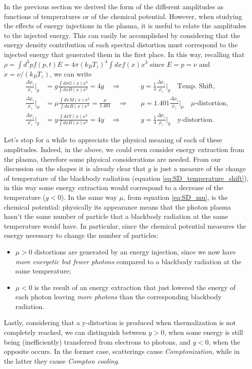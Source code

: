 In the previous section we derived the form of the different amplitudes as functions of temperatures or of the chemical potential. However, when studying the effects of energy injections in the plasma, it is useful to relate the amplitudes to the injected energy. This can easily be accomplished by considering that the energy density contribution of each spectral distortion must correspond to the injected energy that generated them in the first place. In this way, recalling that $\rho=\int d^3pf(p,t)E=4\pi (k_BT_z)^4\int dxf(x)x^3$ since $E=p=\nu$ and $x=\nu/(k_BT_z)$, we can write
\begin{align}
    \label{eq:SD_g_amplitude}\frac{\Delta \rho_\gamma}{\rho_\gamma}\bigg|_g&=g\frac{\int dxG(x)x^3}{\int dx B(x)x^3}=4g\quad\Rightarrow\quad &\boxed{g=\frac{1}{4}\frac{\Delta \rho_\gamma}{\rho_\gamma}\bigg|_g}\quad \text{Temp. Shift,}\\\label{eq:SD_mu_amplitude}
    \frac{\Delta \rho_\gamma}{\rho_\gamma}\bigg|_\mu&=\mu\frac{\int dxM(x)x^3}{\int dx B(x)x^3}=\frac{\mu}{1.401}\quad\Rightarrow\quad &\boxed{\mu=1.401\frac{\Delta \rho_\gamma}{\rho_\gamma}\bigg|_\mu}\quad\mu\text{-distortion,}\\\label{eq:SD_y_amplitude}
    \frac{\Delta \rho_\gamma}{\rho_\gamma}\bigg|_y&=y\frac{\int dxY(x)x^3}{\int dx B(x)x^3}=4y\quad\Rightarrow\quad &\boxed{y=\frac{1}{4}\frac{\Delta \rho_\gamma}{\rho_\gamma}\bigg|_y}\quad\text{y-distortion.}
\end{align}


Let's stop for a while to appreciate the physical meaning of each of these amplitudes. Indeed, in the above, we could even consider energy extraction from the plasma, therefore some physical considerations are needed. From our discussion on the shapes it is already clear that $g$ is just a measure of the change of temperature of the blackbody radiation (equation \eqref{eq:SD_temperature_shift}), in this way some energy extraction would correspond to a decrease of the temperature ($g<0$). In the same way  $\mu$, from equation \eqref{eq:SD_mu}, is the chemical potential: physically its appearance means that the photon plasma hasn't the same number of particle that a blackbody radiation at the same temperature would have. In particular, since the chemical potential measures the energy necessary to change the number of particles:
\begin{itemize}
    \item $\mu>0$ distortions are generated by an energy injection, since we now have \emph{more energetic but fewer photons} compared to a blackbody radiation at the same temperature;
    \item $\mu<0$ is the result of an energy extraction that just lowered the energy of each photon leaving \emph{more photons} than the corresponding blackbody radiation.
\end{itemize}
Lastly, considering that a y-distortion is produced when thermalization is not completely reached, we can distinguish between $y>0$, when some energy is still being (inefficiently) transferred from electrons to photons, and $y<0$, when the opposite occurs. In the former case, scatterings cause \emph{Comptonization}, while in the latter they cause \emph{Compton cooling}. 

